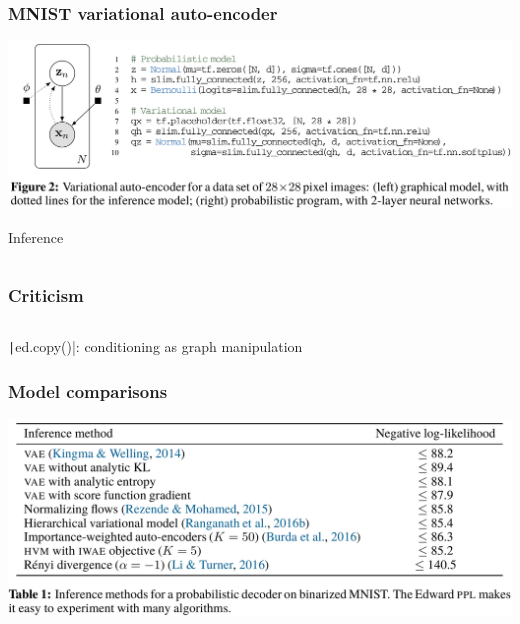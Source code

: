 \documentclass[10pt]{beamer}
\begin{document}
\begin{frame}
  \frametitle{MNIST variational auto-encoder}
  \includegraphics[width=\textwidth]{img/edward-vae.png}

  \begin{block}{Inference}
    \inputminted{python}{python/vae-inference.py}
  \end{block}
\end{frame}


\begin{frame}
  \frametitle{Criticism}
  \begin{block}{}
    \inputminted[fontsize=\scriptsize]{python}{python/beta-bernoulli.py}
  \end{block}
  \texttt|ed.copy()|: conditioning as graph manipulation
\end{frame}


\begin{frame}
  \frametitle{Model comparisons}
  \includegraphics[width=\textwidth]{img/edward-lls.png}
\end{frame}
\end{document}
